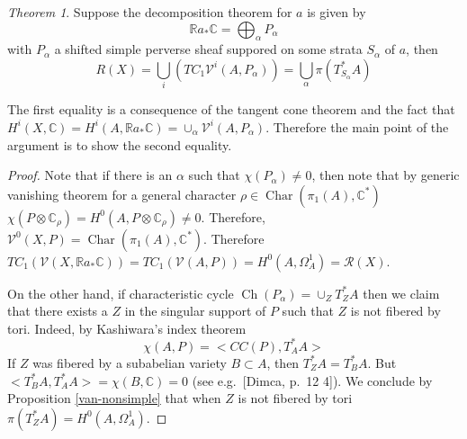 \documentclass[a4paper,12pt,reqno]{amsart}
\theoremstyle{plain}
\theoremstyle{definition}
\theoremstyle{remark}
\newtheorem{alphtheorem}{Theorem}
\DeclareMathOperator{\Char}{Char}
\newcommand{\sR}{\mathcal{R}}
\newcommand\sV{{\mathcal V}}
\newcommand{\bbC}{\mathbb{C}}
\newcommand{\bbR}{\mathbb{R}}
\DeclareMathOperator{\Ch}{Ch}
\begin{document}
\begin{alphtheorem}
Suppose the decomposition theorem
for $a$ is given by
\[\bbR a_*\bbC = \bigoplus_{\alpha}P_{\alpha}\]
with $P_{\alpha}$ a shifted simple perverse sheaf suppored on some strata $S_{\alpha}$ of $a$, then
\[R(X) = \bigcup_i (TC_1 \sV^i(A, P_{\alpha})) = \bigcup_{\alpha}\pi(T^*_{S_{\alpha}}A) \]
\end{alphtheorem}

The first equality is a consequence of the tangent cone theorem and the fact that
$H^i(X, \bbC) = H^i(A, \bbR a_*\bbC) = \cup_{\alpha} \sV^i(A, P_{\alpha})$.
Therefore the main point of the argument is to show the second equality.

\begin{proof}
Note that if there is an $\alpha$ such that $\chi(P_{\alpha}) \neq 0$, then note that by generic vanishing theorem for
a general character $\rho \in \Char(\pi_1(A), \bbC^*)$ $\chi(P\otimes \bbC_{\rho}) = H^0(A, P\otimes \bbC_{\rho}) \neq 0$. Therefore,
$\sV^0(X, P) = \Char(\pi_1(A), \bbC^*)$. Therefore $TC_1(\sV(X, \bbR a_*\bbC)) = TC_1(\sV(A, P)) = H^0(A, \Omega_A^1) =  \sR(X)$.

On the other hand, if characteristic cycle $\Ch(P_{\alpha}) = \cup_Z T^*_ZA$ then we claim that there exists a $Z$ in the singular support of $P$ such that
$Z$ is not fibered by tori. Indeed,
by Kashiwara's index theorem 
\[\chi(A,P) = <CC(P), T^*_AA>\]
If $Z$ was fibered by a subabelian variety $B\subset A$, then $T^*_ZA = T^*_BA$. But $<T^*_BA, T^*_AA> = \chi(B, \bbC) = 0$ (see e.g.\ [Dimca, p.\ 12	4]).
We conclude by Proposition \ref{van-nonsimple} that when $Z$ is not fibered by tori $\pi(T^*_ZA) = H^0(A,\Omega_A^1)$. 


\end{proof}
\end{document}
